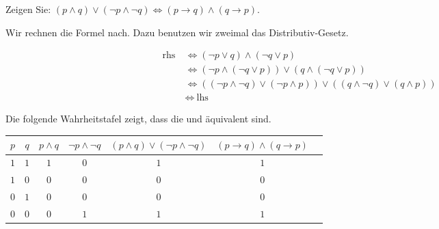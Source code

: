 
\begin{exercise}[19]

Zeigen Sie:
$(p \land q) \lor (\neg p \land \neg q) \Leftrightarrow (p \to q) \land (q \to p)$.

\end{exercise}


\begin{solution}

Wir rechnen die Formel nach.
Dazu benutzen wir zweimal das Distributiv-Gesetz.

\begin{align*}
    \text{rhs}~
    & \iff
    (\neg p \lor q) \land (\neg q \lor p) \\
    & \iff
    (\neg p \land (\neg q \lor p)) \lor (q \land (\neg q \lor p)) \\
    & \iff
    ((\neg p \land \neg q) \lor (\neg p \land p)) \lor ((q \land \neg q) \lor (q \land p)) \\
    & \iff
    ~\text{lhs}
\end{align*}

\end{solution}


\begin{solution}

Die folgende Wahrheitstafel zeigt, dass die  und  äquivalent sind. \\

\begin{tabular}{|c|c|c|c|c|c|c|}
    \hline
    $p$ & $q$ & $p \land q$ & $\neg p \land \neg q$ & $(p \land q) \lor (\neg p \land \neg q)$ & $(p \to q) \land (q \to p)$ \\
    \hline
    $1$ & $1$ & $1$ & $0$ & $1$ & $1$ \\
    \hline
    $1$ & $0$ & $0$ & $0$ & $0$ & $0$ \\
    \hline
    $0$ & $1$ & $0$ & $0$ & $0$ & $0$ \\
    \hline
    $0$ & $0$ & $0$ & $1$ & $1$ & $1$ \\
    \hline
\end{tabular}

\end{solution}

